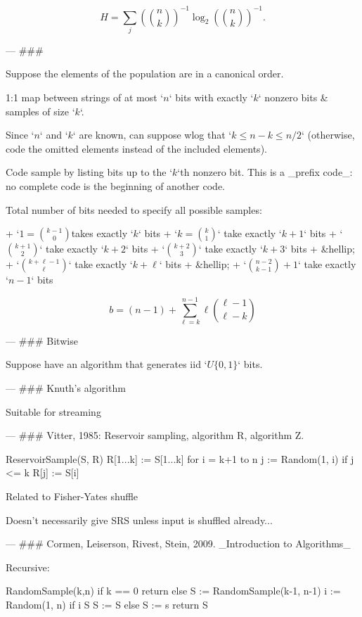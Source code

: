$$ H = \sum_{j} ({{n} \choose {k}})^{-1} \log_2 ({{n} \choose {k}})^{-1}.$$


---
###

Suppose the elements of the population are in a canonical order.

1:1 map between strings of at most `\(n\)` bits with exactly `\(k\)` nonzero bits
& samples of size `\(k\)`.

Since `\(n\)` and `\(k\)` are known, can suppose wlog that `\(k \le n-k \le n/2\)`
(otherwise, code the omitted elements instead of the included elements).

Code sample by listing bits up to the `\(k\)`th nonzero bit.
This is a _prefix code_: no complete code is the beginning of another code.

Total number of bits needed to specify all possible samples:

+ `\(1 = {{k-1} \choose {0}}\)takes exactly `\(k\)` bits
+ `\(k = {{k} \choose {1}}\)` take exactly `\(k+1\)` bits
+ `\({{k+1} \choose 2} \)` take exactly `\(k+2\)` bits
+ `\( {{k+2} \choose 3} \)` take exactly `\(k+3\)` bits
+ &hellip;
+ `\( {{k+\ell-1} \choose {\ell}} \)` take exactly `\(k+\ell\)` bits
+ &hellip;
+ `\( {{n-2} \choose {k-1}} +1 \)` take exactly `\(n-1\)` bits

$$ b = (n-1) + \sum_{\ell=k}^{n-1} \ell {{\ell-1} \choose {\ell-k}} $$



---
### Bitwise

Suppose have an algorithm that generates iid `\(U\{0, 1\}\)` bits.



---
### Knuth's algorithm

Suitable for streaming

---
### Vitter, 1985: Reservoir sampling, algorithm R, algorithm Z. 

    ReservoirSample(S, R)
    R[1...k] :=  S[1...k]
    for i = k+1 to n
        j := Random(1, i)   
        if j <= k
            R[j] := S[i]

Related to Fisher-Yates shuffle

Doesn't necessarily give SRS unless input is shuffled already...

---
### Cormen, Leiserson, Rivest, Stein, 2009. _Introduction to Algorithms_

Recursive:

    RandomSample(k,n)
    if k == 0
        return {}
    else S := RandomSample(k-1, n-1)
        i := Random(1, n)
        if i \in S
            S := S 
        else S := s 
        return S
    

